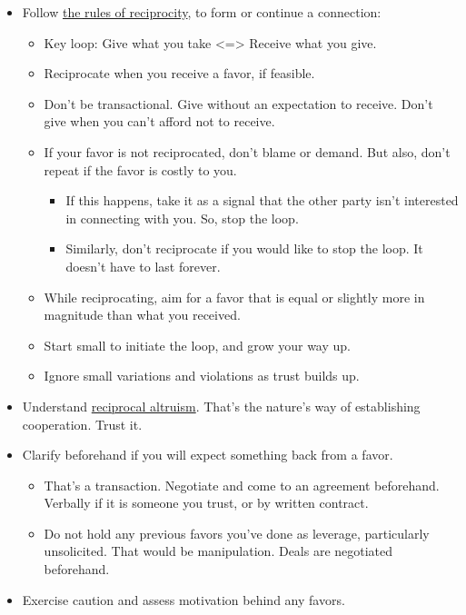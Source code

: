 \documentclass[
]{book}
\providecommand{\tightlist}{%
  \setlength{\itemsep}{0pt}\setlength{\parskip}{0pt}}
\begin{document}
\begin{itemize}
\tightlist
\item
  Follow \href{https://en.wikipedia.org/wiki/Reciprocity_(social_psychology)}{the rules of reciprocity}, to form or continue a connection:

  \begin{itemize}
  \tightlist
  \item
    Key loop: Give what you take \textless=\textgreater{} Receive what you give.\\
  \item
    Reciprocate when you receive a favor, if feasible.
  \item
    Don't be transactional. Give without an expectation to receive. Don't give when you can't afford not to receive.
  \item
    If your favor is not reciprocated, don't blame or demand. But also, don't repeat if the favor is costly to you.

    \begin{itemize}
    \tightlist
    \item
      If this happens, take it as a signal that the other party isn't interested in connecting with you. So, stop the loop.
    \item
      Similarly, don't reciprocate if you would like to stop the loop. It doesn't have to last forever.
    \end{itemize}
  \item
    While reciprocating, aim for a favor that is equal or slightly more in magnitude than what you received.
  \item
    Start small to initiate the loop, and grow your way up.
  \item
    Ignore small variations and violations as trust builds up.
  \end{itemize}
\item
  Understand \href{https://en.wikipedia.org/wiki/Reciprocal_altruism}{reciprocal altruism}. That's the nature's way of establishing cooperation. Trust it.
\item
  Clarify beforehand if you will expect something back from a favor.

  \begin{itemize}
  \tightlist
  \item
    That's a transaction. Negotiate and come to an agreement beforehand. Verbally if it is someone you trust, or by written contract.
  \item
    Do not hold any previous favors you've done as leverage, particularly unsolicited. That would be manipulation. Deals are negotiated beforehand.
  \end{itemize}
\item
  Exercise caution and assess motivation behind any favors.


\end{itemize}
\end{document}

